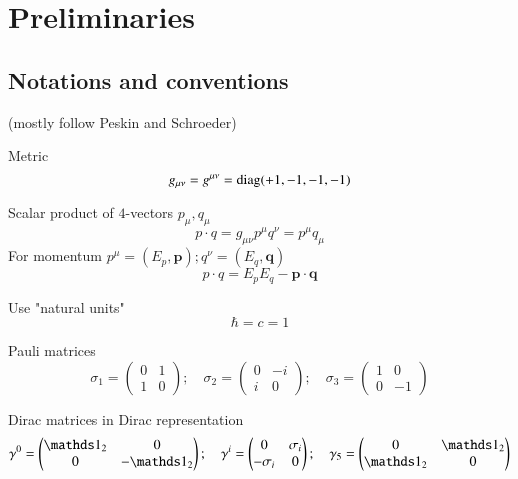 \setcounter{chapter}{-1}
\chapter{Preliminaries}
\section{Notations and conventions}
(mostly follow Peskin and Schroeder)

Metric
\begin{equation}
   g_{\mu\nu} = g^{\mu\nu} = \text{diag}(+1, -1, -1, -1) \label{0.1}
\end{equation}

Scalar product of $4$-vectors $p_\mu, q_\mu$
\begin{equation*}
   p \cdot q = g_{\mu\nu} p^\mu q^\nu = p^\mu q_\mu
\end{equation*}
For momentum $p^\mu = (E_p, \pmb{p}); q^\nu = (E_q, \pmb{q})$
\begin{equation}
   p \cdot q = E_p E_q - \pmb{p}\cdot \pmb{q} \label{0.2}
\end{equation}

Use "natural units"
\begin{equation*}
   \hbar = c = 1
\end{equation*}

Pauli matrices
\begin{equation}
   \sigma_1 = \begin{pmatrix} 0 & 1 \\ 1 & 0 \end{pmatrix}; \quad
   \sigma_2 = \begin{pmatrix} 0 & -i \\ i & 0 \end{pmatrix}; \quad 
   \sigma_3 = \begin{pmatrix} 1 & 0 \\ 0 & -1 \end{pmatrix} \label{0.3}
\end{equation}

Dirac matrices in Dirac representation
\begin{equation}
   \gamma^0 = \begin{pmatrix} \id_2 & 0 \\ 0 & -\id_2 \end{pmatrix}; \quad
   \gamma^i = \begin{pmatrix} 0 & \sigma_i \\ -\sigma_i & 0 \end{pmatrix};\quad
   \gamma_5 = \begin{pmatrix} 0 & \id_2 \\ \id_2 & 0 \end{pmatrix}
   \label{0.5}
\end{equation}

